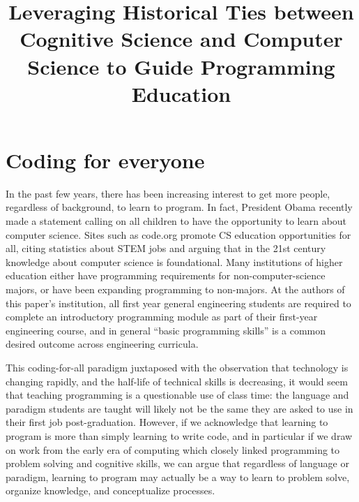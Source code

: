 \documentclass[12pt]{article}
\title{\large \textbf{Leveraging Historical Ties between Cognitive Science and
  Computer Science to Guide Programming Education}}
\author{}
\date{}
\begin{document}
\raggedright
\maketitle
\thispagestyle{empty}
\pagestyle{empty}

\section{Coding for everyone}
In the past few years, there has been increasing interest to get more
people, regardless of background, to learn to program. In fact,
President Obama recently made a statement calling on all children to
have the opportunity to learn about computer
science\autocite{whitehouse_computer_2016}. Sites such as code.org
promote CS education opportunities for all, citing statistics about
STEM jobs and arguing that in the 21st century knowledge about
computer science is foundational\autocite{code.org_every_2016}. Many
institutions of higher education either have programming requirements
for non-computer-science majors, or have been expanding programming to
non-majors\autocite{rich_cs1_2004,forte_motivation_2005,guzdial_design_2005}. At
the authors of this paper's institution, all first year general
engineering students are required to complete an introductory
programming module as part of their first-year engineering course, and
in general ``basic programming skills'' is a common desired outcome
across engineering
curricula\autocite{reid_classification_2014}.

This coding-for-all paradigm juxtaposed with the observation that
technology is changing rapidly, and the half-life of technical skills
is decreasing\autocite{nae_educating_2004}, it would seem that
teaching programming is a questionable use of class time: the language
and paradigm students are taught will likely not be the same they are
asked to use in their first job post-graduation. However, if we
acknowledge that learning to program is more than simply learning to
write code, and in particular if we draw on work from the early era of
computing which closely linked programming to problem solving and
cognitive skills, we can argue that regardless of language or
paradigm, learning to program may actually be a way to learn to
problem solve, organize knowledge, and conceptualize processes.
\end{document}
